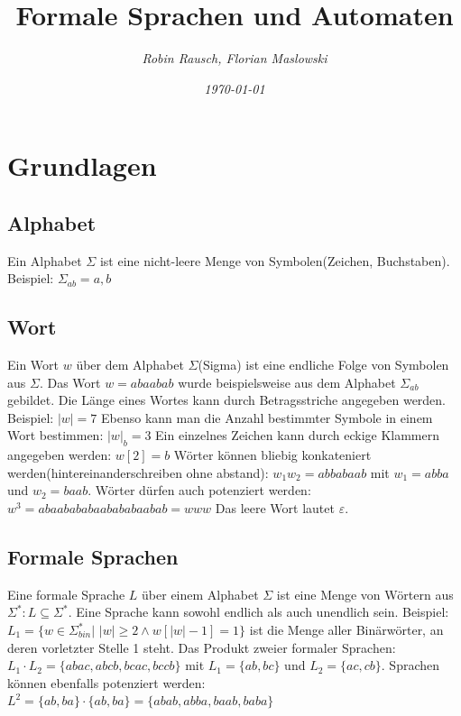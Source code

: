 \documentclass[12pt,a4paper]{article}
\title{Formale Sprachen und Automaten}
\author{\slshape Robin Rausch, Florian Maslowski}
\date{\slshape \today}
\begin{document}
\maketitle
\tableofcontents
\newpage
{}
\section{Grundlagen}
	\subsection{Alphabet}
	Ein Alphabet $\varSigma$ ist eine nicht-leere Menge von Symbolen(Zeichen, Buchstaben).
	Beispiel: $\varSigma_{ab} = { a, b }$

	\subsection{Wort}
	Ein Wort $w$ über dem Alphabet $\varSigma$(Sigma) ist eine endliche Folge von Symbolen aus $\varSigma$. Das Wort $w = abaabab$ wurde beispielsweise aus dem Alphabet $\varSigma_{ab}$ gebildet.\newline
	Die Länge eines Wortes kann durch Betragsstriche angegeben werden. Beispiel: $|w| = 7$\newline
	Ebenso kann man die Anzahl bestimmter Symbole in einem Wort bestimmen: $|w|_b = 3$\newline
	Ein einzelnes Zeichen kann durch eckige Klammern angegeben werden: $w[2] = b$\newline
	Wörter können bliebig konkateniert werden(hintereinanderschreiben ohne abstand): $w_1w_2 = abbabaab$ mit $w_1 = abba$ und $w_2 = baab$.\newline
	Wörter dürfen auch potenziert werden: $w^3 = abaabababaabababaabab = www$\newline
	Das leere Wort lautet $\varepsilon$.

	\subsection{Formale Sprachen}
	Eine formale Sprache $L$ über einem Alphabet $\varSigma$ ist eine Menge von Wörtern aus $\varSigma^*: L \subseteq \varSigma^*$. Eine Sprache kann sowohl endlich als auch unendlich sein.\newline
	Beispiel: $L_1 = \{w \in \varSigma_{bin}^* |$ $|w| \geqslant 2 \wedge w[|w| - 1] = 1\}$ ist die Menge aller Binärwörter, an deren vorletzter Stelle 1 steht.\newline
	Das Produkt zweier formaler Sprachen: $L_1 \cdot L_2 = \{abac, abcb, bcac, bccb\}$ mit $L_1 = \{ab, bc\}$ und $L_2 = \{ ac, cb\}$.\newline
	Sprachen können ebenfalls potenziert werden: $L^2 = \{ab, ba\} \cdot \{ab, ba\} = \{ abab, abba, baab, baba\}$
\end{document}
